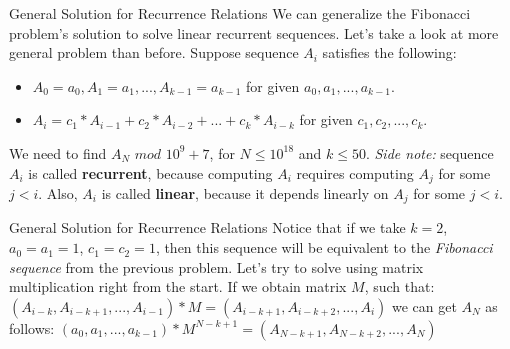 \documentclass{beamer}
\begin{document}
\begin{frame}{General Solution for Recurrence Relations}
  We can generalize the Fibonacci problem's solution to solve linear recurrent sequences.
  \newline
  Let's take a look at more general problem than before. Suppose sequence $A_i$ satisfies the following:
  \begin{itemize}
    \item $A_0 = a_0, A_1 = a_1, ..., A_{k-1} = a_{k-1}$ for given $a_0, a_1, ..., a_{k-1}$.
    \item $A_i = c_1 * A_{i-1} + c_2 * A_{i-2} + ... + c_k * A_{i-k}$ for given $c_1, c_2, ..., c_k$.      
  \end{itemize}
  We need to find $A_N$ $mod$ $10^9 + 7$, for $N \leq 10^{18}$ and $k \leq 50$.
  \newline \newline
  \textit{Side note:} sequence $A_i$ is called \textbf{recurrent}, because computing $A_i$
  requires computing $A_j$ for some $j < i$. Also, $A_i$ is called \textbf{linear},
  because it depends linearly on $A_j$ for some $j < i$.
\end{frame}

\begin{frame}{General Solution for Recurrence Relations}
  Notice that if we take $k = 2$, $a_0 = a_1 = 1$, $c_1 = c_2 = 1$, then this
  sequence will be equivalent to the \textit{Fibonacci sequence} from the previous problem.
  \newline
  Let's try to solve using matrix multiplication right from the start.
  \newline
  If we obtain matrix $M$, such that:
  \newline
  $(A_{i-k}, A_{i-k+1}, ..., A_{i-1}) * M = (A_{i-k+1}, A_{i-k+2}, ..., A_i)$
  \newline
  we can get $A_N$ as follows:
  \newline
  $(a_0, a_1, ..., a_{k-1}) * M^{N-k+1} = (A_{N-k+1}, A_{N-k+2}, ..., A_N)$
\end{frame}
\end{document}
